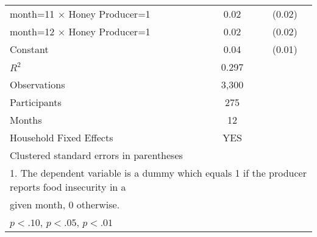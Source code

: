 \begin{table}[htbp]
\begin{tabular}{l*{1}{cc}}
month=11 $\times$ Honey Producer=1&     0.02         &   (0.02)\\
month=12 $\times$ Honey Producer=1&     0.02         &   (0.02)\\
Constant        &     0.04\sym{***}&   (0.01)\\
\midrule
\(R^{2}\)       &    0.297         &         \\
Observations    &    3,300         &         \\
Participants    &      275         &         \\
Months          &       12         &         \\
\hline Household Fixed Effects&      YES         &         \\
\bottomrule
\multicolumn{3}{l}{\footnotesize Clustered standard errors in parentheses}\\
\multicolumn{3}{l}{\footnotesize 1. The dependent variable is a dummy which equals 1 if the producer reports food insecurity in a}\\
\multicolumn{3}{l}{\footnotesize given month, 0 otherwise.}\\
\multicolumn{3}{l}{\footnotesize \sym{*} \(p<.10\), \sym{**} \(p<.05\), \sym{***} \(p<.01\)}\\
\end{tabular}
\end{table}
